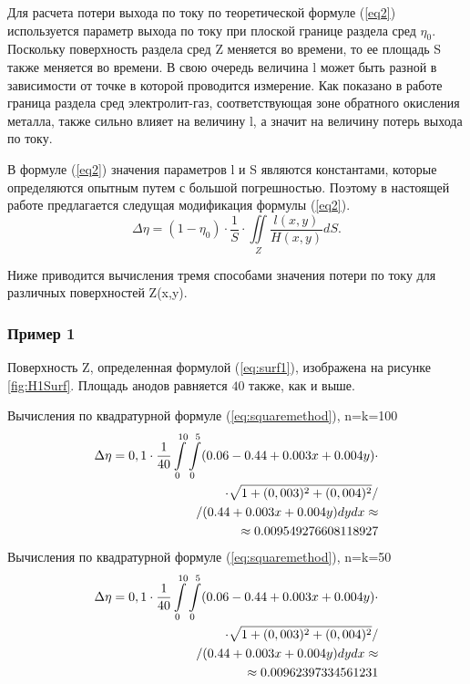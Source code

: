 \documentclass{article}
\begin{document}
Для расчета потери выхода по току по теоретической формуле (\ref{eq2}) используется параметр выхода по току при плоской границе раздела сред $\eta_0$. Поскольку поверхность раздела сред Z меняется во времени, то ее площадь S также меняется во времени. В свою очередь величина l может быть разной в зависимости от точке в которой проводится измерение. Как показано в работе~\cite{litlink:kalmykov} граница раздела  сред электролит-газ, соответствующая зоне обратного окисления металла, также сильно влияет на величину l, а значит на величину потерь выхода по току.

В формуле (\ref{eq2}) значения параметров l и S являются константами, которые определяются опытным путем с большой погрешностью. Поэтому в настоящей работе предлагается следущая модификация формулы (\ref{eq2}).
\begin{equation} \label{eq:modeq2}
\Delta \eta = (1- \eta_0) \cdot \frac{1}{S} \cdot \iint\limits_Z \frac{l(x,y)}{H(x,y)}dS.
\end{equation}

Ниже приводится вычисления тремя способами значения потери по току для различных поверхностей Z(x,y).	%

\subsubsection*{Пример 1}

Поверхность Z, определенная формулой (\ref{eq:surf1}), изображена на рисунке \ref{fig:H1Surf}. Площадь анодов равняется $40$ также, как и выше.

Вычисления по квадратурной формуле (\ref{eq:squaremethod}), n=k=100
\begin{align}
\Delta \eta = 0,1 \cdot \frac{1}{40} \int\limits_0^{10} \int\limits_0^5 (0.06 - 0.44 + 0.003x + 0.004y) \cdot \notag \\
\cdot \sqrt{1+(0,003)^2+(0,004)^2}/ \notag \\ 
/(0.44 + 0.003x + 0.004y) dy dx \approx \notag \\ \approx 0.009549276608118927
\end{align}
Вычисления по квадратурной формуле (\ref{eq:squaremethod}), n=k=50
\begin{align}
\Delta \eta = 0,1 \cdot \frac{1}{40} \int\limits_0^{10} \int\limits_0^5 (0.06 - 0.44 + 0.003x + 0.004y) \cdot \notag \\
\cdot \sqrt{1+(0,003)^2+(0,004)^2}/ \notag \\ 
/(0.44 + 0.003x + 0.004y) dy dx \approx \notag \\ \approx 0.00962397334561231
\end{align}
\end{document}
